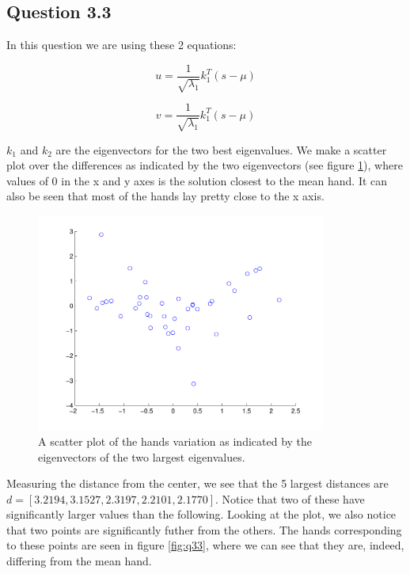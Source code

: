 \subsection*{Question 3.3}
In this question we are using these 2 equations:

\begin{equation}
	u = \frac{1}{\sqrt{\lambda_1}}k^T_1(s-\mu)
\end{equation}

\begin{equation}
	v = \frac{1}{\sqrt{\lambda_1}}k^T_1(s-\mu)
\end{equation}

$k_1$ and $k_2$ are the eigenvectors for the two best eigenvalues. We make a scatter plot over the differences as indicated by the two eigenvectors (see figure \ref{fig:q33scatter}), where values of 0 in the x and y axes is the solution closest to the mean hand. It can also be seen that most of the hands lay pretty close to the x axis.

\begin{figure}[!htbp]
  \centering
  \includegraphics[width=0.85\textwidth]{./images/q33_scatter}
  \caption{A scatter plot of the hands variation as indicated by the eigenvectors of the two largest eigenvalues.}
  \label{fig:q33scatter}
\end{figure}

Measuring the distance from the center, we see that the 5 largest distances are $d = [3.2194, 3.1527, 2.3197, 2.2101, 2.1770]$.
Notice that two of these have significantly larger values than the following.
Looking at the plot, we also notice that two points are significantly futher from the others.
The hands corresponding to these points are seen in figure \ref{fig:q33}, where we can see that they are, indeed, differing from the mean hand.

